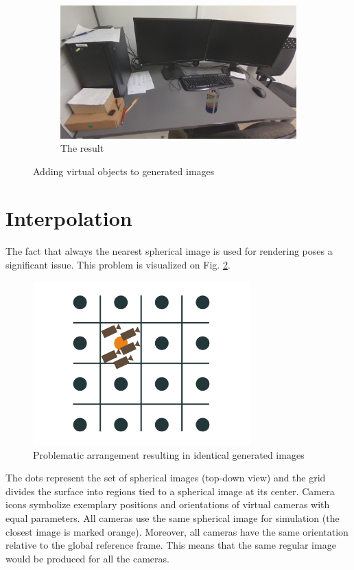 \documentclass{svproc}
\begin{document}
\begin{figure}[!ht]
\begin{subfigure}{.46\textwidth}
    \end{subfigure}
    \begin{subfigure}{\textwidth}
        \centering
        \includegraphics[width=0.5\linewidth]{img/gazebo_integration/sum.jpg}
        \caption{The result}
    \end{subfigure}
    \caption{Adding virtual objects to generated images}
    \label{fig:join}
\end{figure}

\section{Interpolation}

The fact that always the nearest spherical image is used for rendering poses a significant issue.
This problem is visualized on Fig. \ref{fig:interpolation_problem}.
\begin{figure}[!ht]
    \centering
    \includegraphics[width=0.75\textwidth]{img/drawio/interpolation-1.pdf}
    \caption{Problematic arrangement resulting in identical generated images}
    \label{fig:interpolation_problem}
\end{figure}

The dots represent the set of spherical images (top-down view) and the grid divides the surface into regions tied to a spherical image at its center.
Camera icons symbolize exemplary positions and orientations of virtual cameras with equal parameters.
All cameras use the same spherical image for simulation (the closest image is marked orange).
Moreover, all cameras have the same orientation relative to the global reference frame.
This means that the same regular image would be produced for all the cameras.
\end{document}
